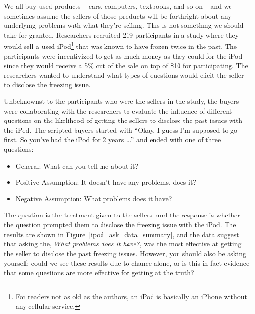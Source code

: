 
\newcommand{\iPodAA}{2}
\newcommand{\iPodAB}{23}
\newcommand{\iPodAC}{36}
\newcommand{\iPodAD}{61}
\newcommand{\iPodAFraction}{0.2785}
\newcommand{\iPodAExpected}{20.33}
\newcommand{\iPodBA}{71}
\newcommand{\iPodBB}{50}
\newcommand{\iPodBC}{37}
\newcommand{\iPodBD}{158}
\newcommand{\iPodBFraction}{0.7215}
\newcommand{\iPodBExpected}{52.67}
\newcommand{\iPodDA}{73}
\newcommand{\iPodDB}{73}
\newcommand{\iPodDC}{73}
\newcommand{\iPodDD}{219}
\newcommand{\iPodN}{\iPodDD}

We all buy used products --
cars, computers, textbooks, and so on --
and we sometimes assume the sellers of those products
will be forthright about any underlying problems with
what they're selling.
This is not something we should take for granted.
Researchers recruited \iPodN{} participants in a study where they
would sell a used iPod\footnote{For readers not as old as
  the authors, an iPod is basically an iPhone without
  any cellular service.}
that was known to have frozen twice in the past.
The participants were incentivized to get as much money
as they could for the iPod since they would receive a 5\%
cut of the sale on top of \$10 for participating.
The researchers wanted to understand what types of questions
would elicit the seller to disclose the freezing issue.

Unbeknownst to the participants who were the sellers
in the study,
the buyers were collaborating with the researchers
to evaluate the influence of different questions
on the likelihood of getting the sellers to disclose
the past issues with the iPod.
The scripted buyers started with
``Okay, I guess I'm supposed to go first.
  So you've had the iPod for 2 years ...''
and ended with one of three questions:
\begin{itemize}
\item General: What can you tell me about it?
\item Positive Assumption: It doesn't have any problems, does it?
\item Negative Assumption: What problems does it have?
\end{itemize}
The question is the treatment given to the sellers,
and the response is whether the question prompted them
to disclose the freezing issue with the iPod.
The results are shown in Figure~\ref{ipod_ask_data_summary},
and the data suggest that asking the,
\emph{What problems does it have?},
was the most effective at getting the seller to disclose
the past freezing issues.
However, you should also be asking yourself:
could we see these results due to chance alone,
or is this in fact evidence that some questions
are more effective for getting at the truth?

